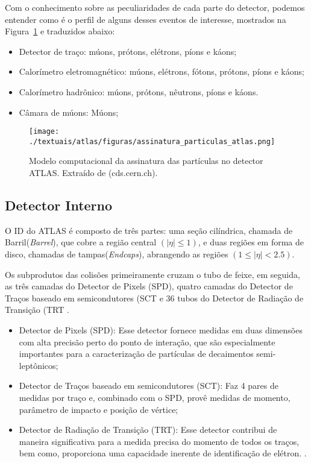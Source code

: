 Com o conhecimento sobre as peculiaridades de cada parte do detector, podemos entender como é o perfil de alguns desses eventos de interesse, mostrados na Figura~\ref{fig:2T15} e traduzidos abaixo:

\begin{itemize}
  \item Detector de traço: múons, prótons, elétrons, píons e káons;
  \item Calorímetro eletromagnético: múons, elétrons, fótons, prótons, píons e káons;
  \item Calorímetro hadrônico: múons, prótons, nêutrons, píons e káons.
  \item Câmara de múons: Múons;
\end{itemize}

\begin{figure}[h!]
	\centering
	\texttt{[image: ./textuais/atlas/figuras/assinatura\_particulas\_atlas.png]}\\
	\caption{Modelo computacional da assinatura das partículas no detector ATLAS. Extraído de (cds.cern.ch).}
	\label{fig:2T15}
\end{figure}

\subsection{Detector Interno}

O \ac{ID} do ATLAS é composto de três partes: uma seção cilíndrica, chamada de Barril(\emph{Barrel}), que cobre a região central $\left( {\left| \eta  \right| \le 1} \right)$, e duas regiões em forma de disco, chamadas de tampas(\emph{Endcaps}), abrangendo as regiões $\left( {1 \le \left| \eta  \right| < 2.5} \right)$.

Os subprodutos das colisões primeiramente cruzam o tubo de feixe, em seguida, as três camadas do Detector de Pixels  (\ac{SPD}), quatro camadas do Detector de Traços baseado em semicondutores (\ac{SCT} e 36 tubos do Detector de Radiação de Transição (\ac{TRT} \cite{barberis2000atlas}.

\begin{itemize}
\item Detector de Pixels  (\ac{SPD}): Esse detector fornece medidas em duas dimensões com alta precisão perto do ponto de interação, que são especialmente importantes para a caracterização de partículas de decaimentos semi-leptônicos;

\item Detector de Traços baseado em semicondutores (\ac{SCT}): Faz 4 pares de medidas por traço e, combinado com o SPD, provê medidas de momento, parâmetro de impacto e posição de vértice;

\item Detector de Radiação de Transição (\ac{TRT}): Esse detector contribui de maneira significativa para a medida precisa do momento de todos os traços, bem como, proporciona uma capacidade inerente de identificação de elétron. \cite{benekos2003atlas}.
\end{itemize}

